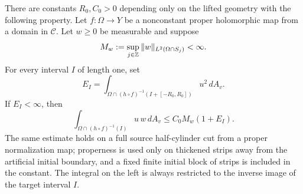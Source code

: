 \begin{proposition}
\label{cylinder:estimate}
There are constants $R_0,C_0>0$ depending only on the lifted geometry
with the following property.  Let $f:\Omega\to Y$ be a nonconstant
proper holomorphic map from a domain in $\mathcal C$.  Let $w\geq0$
be measurable and suppose
\[
 M_w:=\sup_{j\in\mathbb Z}\|w\|_{L^2(\Omega\cap S_j)}<\infty.
\]
For every interval $I$ of length one, set
\[
 E_I=\int_{\Omega\cap(h\circ f)^{-1}(I+[-R_0,R_0])}
                          u^2\,dA_v.
\]
If $E_I<\infty$, then
\begin{equation}\label{cylinder:estimate-formula}
 \int_{\Omega\cap(h\circ f)^{-1}(I)}u\,w\,dA_v
            \leq C_0M_w(1+E_I).
\end{equation}
The same estimate holds on a full source half-cylinder cut from a
proper normalization map; properness is used only on thickened strips
away from the artificial initial boundary, and a fixed finite initial
block of strips is included in the constant. The integral on the left is
always restricted to the inverse image of the target interval $I$.
\end{proposition}


